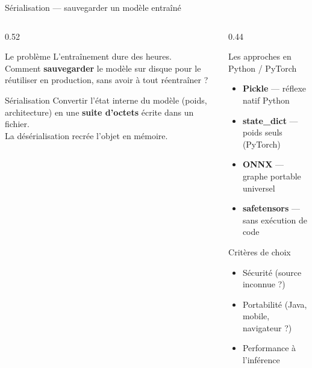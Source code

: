 \documentclass[aspectratio=169, 10pt]{beamer}
\begin{document}
\begin{frame}{Sérialisation --- sauvegarder un modèle entraîné}
  \begin{columns}[T]
    \begin{column}{0.52\textwidth}
      \begin{alertblock}{Le problème}
        L'entraînement dure des heures.\\[4pt]
        Comment \textbf{sauvegarder} le modèle sur disque
        pour le réutiliser en production,
        sans avoir à tout réentraîner ?
      \end{alertblock}
      \vspace{4pt}
      \begin{block}{Sérialisation}
        Convertir l'état interne du modèle
        (poids, architecture) en une \textbf{suite d'octets}
        écrite dans un fichier.\\[4pt]
        La désérialisation recrée l'objet en mémoire.
      \end{block}
    \end{column}
    \begin{column}{0.44\textwidth}
      \begin{exampleblock}{Les approches en Python / PyTorch}
        \begin{itemize}
          \item \textbf{Pickle} --- réflexe natif Python
          \item \textbf{state\_dict} --- poids seuls (PyTorch)
          \item \textbf{ONNX} --- graphe portable universel
          \item \textbf{safetensors} --- sans exécution de code
        \end{itemize}
      \end{exampleblock}
      \vspace{4pt}
      \begin{block}{Critères de choix}
        \begin{itemize}
          \item Sécurité (source inconnue ?)
          \item Portabilité (Java, mobile, navigateur ?)
          \item Performance à l'inférence
        \end{itemize}
      \end{block}
    \end{column}
  \end{columns}
\end{frame}
\end{document}
